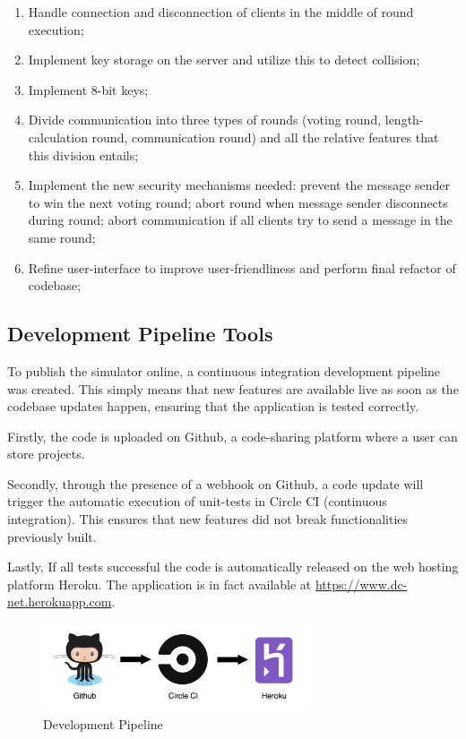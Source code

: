 \begin{enumerate}
    \item Handle connection and disconnection of clients in the middle of round execution;
    \item Implement key storage on the server and utilize this to detect collision;
    \item Implement 8-bit keys;
    \item Divide communication into three types of rounds (voting round, length-calculation round, communication round) and all the relative features that this division entails;
    \item Implement the new security mechanisms needed: prevent the message sender to win the next voting round; abort round when message sender disconnects during round; abort communication if all clients try to send a message in the same round;
    \item Refine user-interface to improve user-friendliness and perform final refactor of codebase;
\end{enumerate}


\subsection{Development Pipeline Tools}
To publish the simulator online, a continuous integration development pipeline was created. This simply means that new features are available live as soon as the codebase updates happen, ensuring that the application is tested correctly. \newline

Firstly, the code is uploaded on Github, a code-sharing platform where a user can store projects.

Secondly, through the presence of a webhook on Github, a code update will trigger the automatic execution of unit-tests in Circle CI (continuous integration). This ensures that new features did not break functionalities previously built.

Lastly, If all tests successful the code is automatically released on the web hosting platform Heroku. The application is in fact available at \url{https://www.dc-net.herokuapp.com}.

\begin{figure}[h!]
    \centering
    \includegraphics[width=0.70\textwidth]{Images/pipeline.png}
    \caption{Development Pipeline}
    \label{fig:devPipeline}
\end{figure}


